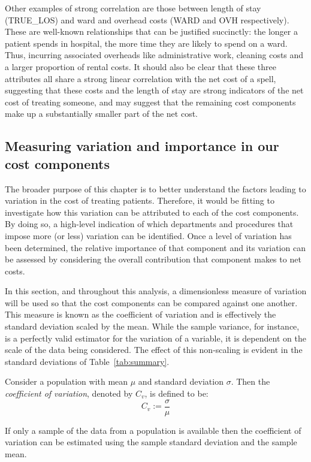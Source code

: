 Other examples of strong correlation are those between length of stay
(TRUE\_LOS) and ward and overhead costs (WARD and OVH respectively). These are
well-known relationships that can be justified succinctly: the longer a patient
spends in hospital, the more time they are likely to spend on a ward. Thus,
incurring associated overheads like administrative work, cleaning costs and a
larger proportion of rental costs. It should also be clear that these three
attributes all share a strong linear correlation with the net cost of a spell,
suggesting that these costs and the length of stay are strong indicators of the
net cost of treating someone, and may suggest that the remaining cost components
make up a substantially smaller part of the net cost.


\subsection{Measuring variation and importance in our cost components}

The broader purpose of this chapter is to better understand the factors leading
to variation in the cost of treating patients. Therefore, it would be fitting to
investigate how this variation can be attributed to each of the cost components.
By doing so, a high-level indication of which departments and procedures that
impose more (or less) variation can be identified. Once a level of variation has
been determined, the relative importance of that component and its variation can
be assessed by considering the overall contribution that component makes to net
costs.

In this section, and throughout this analysis, a dimensionless measure of
variation will be used so that the cost components can be compared against one
another. This measure is known as the coefficient of variation and is
effectively the standard deviation scaled by the mean. While the sample
variance, for instance, is a perfectly valid estimator for the variation of a
variable, it is dependent on the scale of the data being considered. The effect
of this non-scaling is evident in the standard deviations of
Table~\ref{tab:summary}.

\begin{definition}
    Consider a population with mean \(\mu\) and standard deviation \(\sigma\).
    Then the \emph{coefficient of variation}, denoted by \(C_v\), is defined to
    be:
    \begin{equation}\label{eq:coeff_var}
        C_{v} := \frac{\sigma}{\mu}
    \end{equation}

    If only a sample of the data from a population is available then the
    coefficient of variation can be estimated using the sample standard
    deviation and the sample mean.
\end{definition}

